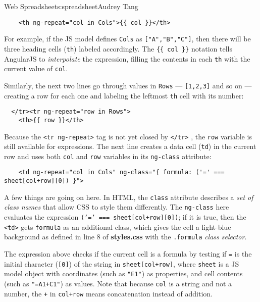 \begin{aosachapter}{Web Spreadsheet}{s:spreadsheet}{Audrey Tang}
\begin{verbatim}
    <th ng-repeat="col in Cols">{{ col }}</th>
\end{verbatim}

For example, if the JS model defines \texttt{Cols} as
\texttt{{[}"A","B","C"{]}}, then there will be three heading cells
(\texttt{th}) labeled accordingly. The \texttt{\{\{ col \}\}} notation
tells AngularJS to \emph{interpolate} the expression, filling the
contents in each \texttt{th} with the current value of \texttt{col}.

Similarly, the next two lines go through values in \texttt{Rows} ---
\texttt{{[}1,2,3{]}} and so on --- creating a row for each one and
labeling the leftmost \texttt{th} cell with its number:

\begin{verbatim}
  </tr><tr ng-repeat="row in Rows">
    <th>{{ row }}</th>
\end{verbatim}

Because the \texttt{\textless{}tr ng-repeat\textgreater{}} tag is not
yet closed by \texttt{\textless{}/tr\textgreater{}} , the \texttt{row}
variable is still available for expressions. The next line creates a
data cell (\texttt{td}) in the current row and uses both \texttt{col}
and \texttt{row} variables in its \texttt{ng-class} attribute:

\begin{verbatim}
    <td ng-repeat="col in Cols" ng-class="{ formula: ('=' === sheet[col+row][0]) }">
\end{verbatim}

A few things are going on here. In HTML, the \texttt{class} attribute
describes a \emph{set of class names} that allow CSS to style them
differently. The \texttt{ng-class} here evaluates the expression
\texttt{('=' === sheet{[}col+row{]}{[}0{]})}; if it is true, then the
\texttt{\textless{}td\textgreater{}} gets \texttt{formula} as an
additional class, which gives the cell a light-blue background as
defined in line 8 of \textbf{styles.css} with the \texttt{.formula}
\emph{class selector}.

The expression above checks if the current cell is a formula by testing
if \texttt{=} is the initial character (\texttt{{[}0{]}}) of the string
in \texttt{sheet{[}col+row{]}}, where \texttt{sheet} is a JS model
object with coordinates (such as \texttt{"E1"}) as properties, and cell
contents (such as \texttt{"=A1+C1"}) as values. Note that because
\texttt{col} is a string and not a number, the \texttt{+} in
\texttt{col+row} means concatenation instead of addition.


\end{aosachapter}
